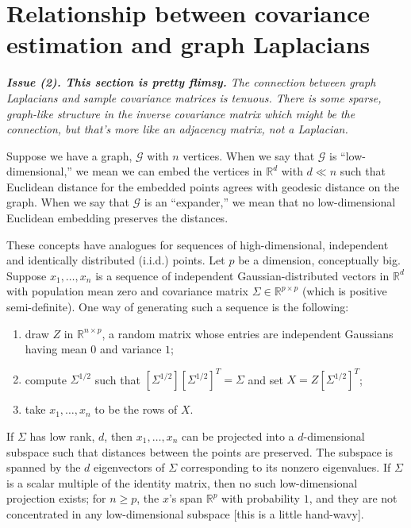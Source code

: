 \documentclass{article}
\begin{document}
\section{Relationship between covariance estimation and graph Laplacians}

\textit{\textbf{Issue (2). This section is pretty flimsy.} The connection between graph Laplacians and sample covariance matrices is tenuous.  There is some sparse, graph-like structure in the inverse covariance matrix which might be the connection, but that's more like an adjacency matrix, not a Laplacian.}

Suppose we have a graph, $\mathcal{G}$ with $n$ vertices.  When we
say that $\mathcal{G}$ is ``low-dimensional,'' we mean we can embed the
vertices in $\mathbb{R}^d$ with $d \ll n$ such that Euclidean distance
for the embedded points agrees with geodesic distance on the graph.  When
we say that $\mathcal{G}$ is an ``expander,'' we mean that no low-dimensional
Euclidean embedding preserves the distances.

These concepts have analogues for sequences of high-dimensional,
independent and identically distributed (i.i.d.) points.  Let $p$ be
a dimension, conceptually big.  Suppose $x_1, \ldots, x_n$ is a sequence
of independent Gaussian-distributed vectors in $\mathbb{R}^d$ with population
mean zero and covariance matrix $\Sigma \in \mathbb{R}^{p \times p}$ 
(which is positive semi-definite).  One way of generating such a sequence
is the following:
\begin{enumerate}
    \item draw $Z$ in $\mathbb{R}^{n \times p}$, a random matrix whose
        entries are independent Gaussians having mean $0$ and variance $1$;
    \item compute $\Sigma^{1/2}$ such that
        $[\Sigma^{1/2}] [\Sigma^{1/2}]^T = \Sigma$ and set
        $X = Z [\Sigma^{1/2}]^{T}$;
    \item take $x_1, \ldots, x_n$ to be the rows of $X$.
\end{enumerate}
If $\Sigma$ has low rank, $d$, then $x_1, \ldots, x_n$ can be projected
into a $d$-dimensional subspace such that distances between the points
are preserved.  The subspace is spanned by the $d$ eigenvectors of
$\Sigma$ corresponding to its nonzero eigenvalues.  If $\Sigma$ is
a scalar multiple of the identity matrix, then no such low-dimensional
projection exists; for $n \geq p$, the $x$'s span $\mathbb{R}^p$ with
probability $1$, and they are not concentrated in any low-dimensional
subspace [this is a little hand-wavy].
\end{document}
